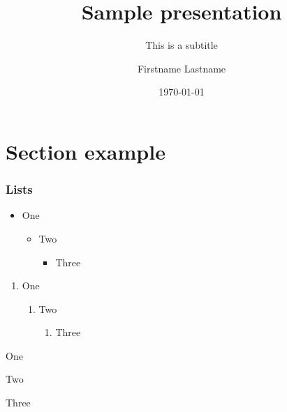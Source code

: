 \documentclass[aspectratio=169]{beamer}
\title{Sample presentation}
\subtitle{This is a subtitle}
\author{Firstname Lastname}
\institute{Worcester Polytechnic Institute}
\date{\today}
\begin{document}
\maketitle

\section{Section example}

\begin{frame}
  \frametitle{Lists}
  \begin{itemize}
  \item One
    \begin{itemize}
    \item Two
      \begin{itemize}
      \item Three
      \end{itemize}
    \end{itemize}
  \end{itemize}

  \begin{enumerate}
  \item One
    \begin{enumerate}
    \item Two
      \begin{enumerate}
      \item Three
      \end{enumerate}
    \end{enumerate}
  \end{enumerate}

  \begin{description}[One]
  \item[One] One
    \begin{description}[Two]
    \item[Two] Two
      \begin{description}[Three]
      \item[Three] Three
      \end{description}
    \end{description}
  \end{description}
\end{frame}
\end{document}
